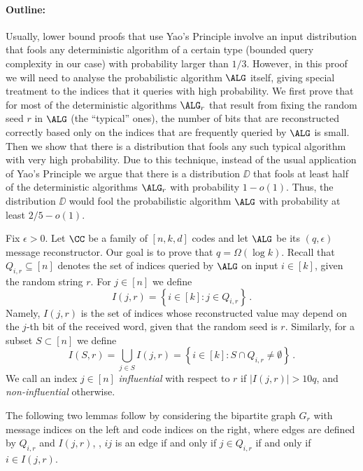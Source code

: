 \paragraph{Outline:} Usually, lower bound proofs that use Yao's Principle involve an input distribution that fools any deterministic algorithm of a certain type (bounded query complexity in our case) with probability larger than $1/3$. However, in this proof we will need to analyse the probabilistic algorithm $\ALG$ itself, giving special treatment to the indices that it queries with high probability.
We first prove that for most of the deterministic algorithms $\ALG_r$ that result from fixing the random seed $r$ in $\ALG$ (the ``typical'' ones), the number of bits
that are reconstructed correctly based only on the indices that are frequently queried by $\ALG$ is small. Then we show that there is a distribution that fools any such typical algorithm with very high probability. Due to this technique, instead of the usual application of Yao's Principle we argue that there is a distribution $\DD$ that fools at least half of the deterministic algorithms $\ALG_r$ with probability $1-o(1)$. Thus, the distribution $\DD$ would fool the probabilistic algorithm $\ALG$ with probability at least $2/5-o(1)$.
%

%

%

%
%
%

Fix $\epsilon > 0$. Let $\CC$ be a family of $[n,k,d]$ codes and let $\ALG$ be its $(q,\epsilon)$ message reconstructor. Our goal is to prove that $q=\Omega(\log k)$.
Recall that $Q_{i,r} \subseteq [n]$ denotes the set of indices queried
by $\ALG$ on input $i \in [k]$, given the random string $r$. For $j\in
[n]$ we define
\[
I(j, r) = \left\{ i\in [k] : j \in Q_{i, r}\right\}\,.
\]
Namely,
 $I(j, r)$ is the set of indices whose reconstructed value
may depend on the 
%
$j$-th 
bit of the received word, given that the random seed is $r$.
Similarly, for a subset $S\subset [n]$ we define
\[
I(S,r) = \bigcup_{j \in S}I(j,r)= \left\{ i\in [k] : S\cap Q_{i, r}\neq
\emptyset\right\}\,.
\]
We call an index $j \in [n]$
 \emph{influential} with respect to $r$ if $|I(j,r)| > 10 q$, and \emph{non-influential} otherwise.

The following two lemmas follow by considering the bipartite graph $G_r$ with message indices on the left and code indices on the right, where edges are defined by $Q_{i,r}$ and $I(j,r)$, \ie, $ij$ is an edge if and only if $j \in Q_{i,r}$ if and only if  $i \in I(j,r)$.

